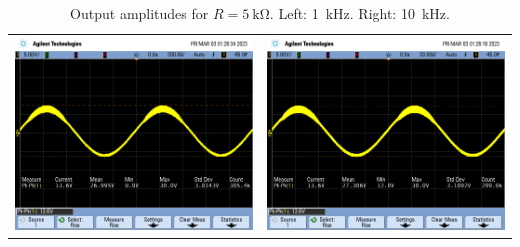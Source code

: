 \documentclass[11pt]{article}
\begin{document}
\begin{table}[H]
\caption{\label{fig:5k}Output amplitudes for \(R = \qty{5}{\kilo\ohm}\). Left: \qty{1}{\kilo\hertz}. Right: \qty{10}{\kilo\hertz}.}
\centering
\begin{tabular}{ll}
\includegraphics[width=8cm]{./5k_1k.png} & \includegraphics[width=8cm]{./5k_10k.png}\\[0pt]
\end{tabular}
\end{table}
\end{document}
